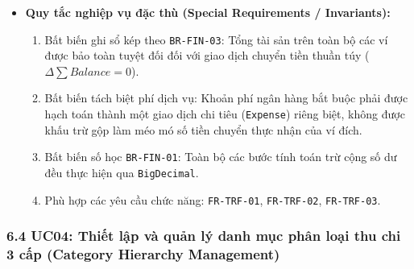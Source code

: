 \documentclass[11pt,a4paper]{article}
\providecommand{\tightlist}{
  \setlength{\itemsep}{0pt}\setlength{\parskip}{0pt}}
\begin{document}
\begin{itemize}
\begin{itemize}
    \begin{itemize}
    \tightlist
    \item
      2b4a1. Tại bước 2b4, hệ thống phát hiện số dư khả dụng hiện tại
      của ví đích nhỏ hơn số tiền đã nhận từ giao dịch chuyển tiền
      (\(Balance_{to} < amount\)) do ví đích đã dùng tiền này để chi
      tiêu trong các giao dịch tiếp theo.
    \item
      2b4a2. Hệ thống từ chối thao tác hủy và hiển thị thông báo: "Không
      thể hủy giao dịch chuyển tiền này vì ví đích không còn đủ số dư để
      hoàn trả".
    \end{itemize}
  \end{itemize}
\item
  \textbf{Quy tắc nghiệp vụ đặc thù (Special Requirements /
  Invariants):}

  \begin{enumerate}
  \def\labelenumi{\arabic{enumi}.}
  \tightlist
  \item
    Bất biến ghi sổ kép theo \texttt{BR-FIN-03}: Tổng tài sản trên toàn
    bộ các ví được bảo toàn tuyệt đối đối với giao dịch chuyển tiền
    thuần túy (\(\Delta \sum Balance = 0\)).
  \item
    Bất biến tách biệt phí dịch vụ: Khoản phí ngân hàng bắt buộc phải
    được hạch toán thành một giao dịch chi tiêu (\texttt{Expense}) riêng
    biệt, không được khấu trừ gộp làm méo mó số tiền chuyển thực nhận
    của ví đích.
  \item
    Bất biến số học \texttt{BR-FIN-01}: Toàn bộ các bước tính toán trừ
    cộng số dư đều thực hiện qua \texttt{BigDecimal}.
  \item
    Phù hợp các yêu cầu chức năng: \texttt{FR-TRF-01},
    \texttt{FR-TRF-02}, \texttt{FR-TRF-03}.
  \end{enumerate}
\end{itemize}

\subsubsection{6.4 UC04: Thiết lập và quản lý danh mục phân loại thu chi
3 cấp (Category Hierarchy
Management)}\label{64-uc04-thiux1ebft-lux1eadp-vuxe0-quux1ea3n-luxfd-danh-mux1ee5c-phuxe2n-loux1ea1i-thu-chi-3-cux1ea5p-category-hierarchy-management}
\end{document}
